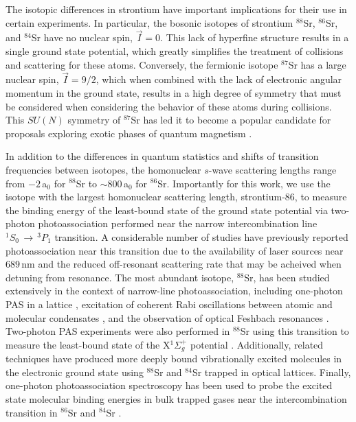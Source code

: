 The isotopic differences in strontium have important implications for their use in certain experiments.
In particular, the bosonic isotopes of strontium $^{88}$Sr, $^{86}$Sr, and $^{84}$Sr have no nuclear spin, $\vec{I}=0$.
This lack of hyperfine structure results in a single ground state potential, which greatly simplifies the treatment of collisions and scattering for these atoms.
Conversely, the fermionic isotope $^{87}$Sr has a large nuclear spin, $\vec{I}=9/2$, which when combined with the lack of electronic angular momentum in the ground state, results in a high degree of symmetry that must be considered when considering the behavior of these atoms during collisions.
This $SU(N)$ symmetry of $^{87}$Sr has led it to become a popular candidate for proposals exploring exotic phases of quantum magnetism \cite{Beverland2016,cre14,Chen2015}.

In addition to the differences in quantum statistics and shifts of transition frequencies between isotopes, the homonuclear $s$-wave scattering lengths range from $-2\,$a$_0$ for $^{88}$Sr to $\sim\!800\,$a$_0$ for $^{86}$Sr.
Importantly for this work, we use the isotope with the largest homonuclear scattering length, strontium-86, to measure the binding energy of the least-bound state of the ground state potential via two-photon photoassociation performed near the narrow intercombination line $^1S_0\,\rightarrow\,^3P_1$ transition.
A considerable number of studies have previously reported photoassociation near this transition due to the availability of laser sources near $689\,$nm and the reduced off-resonant scattering rate that may be acheived when detuning from resonance.
The most abundant isotope, $^{88}$Sr, has been studied extensively in the context of narrow-line photoassociation, including one-photon PAS in a lattice \cite{Zelevinsky2006,McGuyer2013}, excitation of coherent Rabi oscillations between atomic and molecular condensates \cite{Yan2013b}, and the observation of optical Feshbach resonances \cite{Yan2013c, Blatt}.
Two-photon PAS experiments were also performed in $^{88}$Sr using this transition to measure the least-bound state of the X$^1\Sigma_g^+$ potential \cite{MartinezDeEscobar2008}.
Additionally, related techniques have produced more deeply bound vibrationally excited molecules in the electronic ground state using $^{88}$Sr \cite{Reinaudi2012, McGuyer2014, McGuyer2015a, rom12} and $^{84}$Sr \cite{Stellmer2012} trapped in optical lattices.
Finally, one-photon photoassociation spectroscopy has been used to probe the excited state molecular binding energies in bulk trapped gases near the intercombination transition in $^{86}$Sr \cite{Borkowski2014a, Reschovsky} and $^{84}$Sr \cite{Stellmer2012, Reschovsky}.

